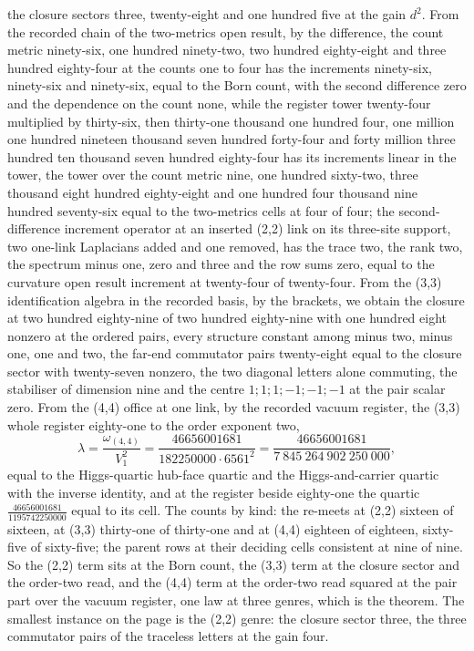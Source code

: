 \begin{chproof}
the closure sectors three, twenty-eight and one hundred five at the gain $d^{2}$. From the recorded chain of the two-metrics open result, by the difference, the count metric ninety-six, one hundred ninety-two, two hundred eighty-eight and three hundred eighty-four at the counts one to four has the increments ninety-six, ninety-six and ninety-six, equal to the Born count, with the second difference zero and the dependence on the count none, while the register tower twenty-four multiplied by thirty-six, then thirty-one thousand one hundred four, one million one hundred nineteen thousand seven hundred forty-four and forty million three hundred ten thousand seven hundred eighty-four has its increments linear in the tower, the tower over the count metric nine, one hundred sixty-two, three thousand eight hundred eighty-eight and one hundred four thousand nine hundred seventy-six equal to the two-metrics cells at four of four; the second-difference increment operator at an inserted (2,2) link on its three-site support, two one-link Laplacians added and one removed, has the trace two, the rank two, the spectrum minus one, zero and three and the row sums zero, equal to the curvature open result increment at twenty-four of twenty-four. From the (3,3) identification algebra in the recorded basis, by the brackets, we obtain the closure at two hundred eighty-nine of two hundred eighty-nine with one hundred eight nonzero at the ordered pairs, every structure constant among minus two, minus one, one and two, the far-end commutator pairs twenty-eight equal to the closure sector with twenty-seven nonzero, the two diagonal letters alone commuting, the stabiliser of dimension nine and the centre $1;1;1;-1;-1;-1$ at the pair scalar zero. From the (4,4) office at one link, by the recorded vacuum register, the (3,3) whole register eighty-one to the order exponent two,
\begin{equation}
\lambda = \frac{\omega_{(4,4)}}{V_{1}^{2}} = \frac{46656001681}{182250000 \cdot 6561^{2}} = \frac{46656001681}{7\ 845\ 264\ 902\ 250\ 000} ,
\end{equation}
equal to the Higgs-quartic hub-face quartic and the Higgs-and-carrier quartic with the inverse identity, and at the register beside eighty-one the quartic $\tfrac{46656001681}{1195742250000}$ equal to its cell. The counts by kind: the re-meets at (2,2) sixteen of sixteen, at (3,3) thirty-one of thirty-one and at (4,4) eighteen of eighteen, sixty-five of sixty-five; the parent rows at their deciding cells consistent at nine of nine. So the (2,2) term sits at the Born count, the (3,3) term at the closure sector and the order-two read, and the (4,4) term at the order-two read squared at the pair part over the vacuum register, one law at three genres, which is the theorem. The smallest instance on the page is the (2,2) genre: the closure sector three, the three commutator pairs of the traceless letters at the gain four.


\end{chproof}
